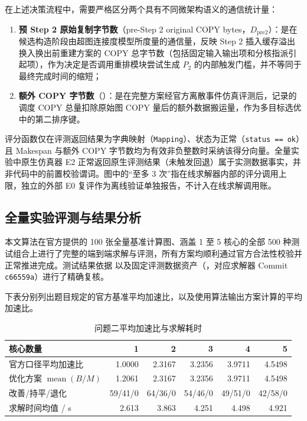 \documentclass[anonymous,withtoc]{gmcm2026}
\providecommand{\tightlist}{\setlength{\itemsep}{0pt}\setlength{\parskip}{0pt}}
\begin{document}
在上述决策流程中，需要严格区分两个具有不同微架构语义的通信统计量：

\begin{enumerate}
\def\labelenumi{\arabic{enumi}.}
\tightlist
\item
  \textbf{预 Step 2 原始复制字节数}（pre-Step 2 original COPY bytes，\(D_{\mathrm{pre2}}\)）：是在候选构造阶段由超图连接度模型所度量的通信量，反映 Step 2 插入缓存溢出换入换出前重建方案的 COPY 总字节数（包括固定输入输出项和分核指派引起项），作为决定是否调用重排模块尝试生成 \(P_2\) 的内部触发门槛，并不等同于最终完成时间的缩短；
\item
  \textbf{额外 COPY 字节数}（\texttt{}）：是在完整方案经官方离散事件仿真评测后，记录的调度 COPY 总量扣除原始图 COPY 量后的额外数据搬运量，作为多目标选优中的第二排序键。
\end{enumerate}

评分函数仅在评测返回结果为字典映射（\texttt{Mapping}）、状态为正常（\texttt{status\ ==\ \textquotesingle{}ok\textquotesingle{}}）且 Makespan 与额外 COPY 字节数均为有效非负整数时采纳该得分向量。全量实验中原生仿真器 E2 正常返回原生评测结果（未触发回退）属于实测数据事实，并非代码中的前置校验谓词。图中的``至多 3 次''指在线求解器内部的评分调用上限，独立的外部 E0 复评作为离线验证单独报告，不计入在线求解调用账。

\subsection{全量实验评测与结果分析}

本文算法在官方提供的 100 张全量基准计算图、涵盖 1 至 5 核心的全部 500 种测试组合上进行了完整的端到端求解与评测，所有方案均顺利通过官方合法性校验并正常推进完成。测试结果依据 \texttt{} 以及固定评测数据资产（\texttt{}，对应求解器 Commit \texttt{c66559a}）进行了精确复核。

下表分别列出题目规定的官方基准平均加速比，以及使用算法输出方案计算的平均加速比。



\begin{table}[H]\centering
\caption{问题二平均加速比与求解耗时}\label{tab:05-p2-1}\normalsize

\begin{tabularx}{\linewidth}{@{}Xrrrrr@{}}\toprule
核心数量 & 1 & 2 & 3 & 4 & 5 \\
\midrule
官方口径平均加速比 & 1.0000 & 2.3167 & 3.2356 & 3.9711 & 4.5498 \\
优化方案 $\operatorname{mean}(B/M)$ & 1.2061 & 2.3167 & 3.2356 & 3.9711 & 4.5498 \\
改善/持平/退化 & 59/41/0 & 64/36/0 & 54/46/0 & 49/51/0 & 42/58/0 \\
求解时间均值 / s & 2.613 & 3.863 & 4.251 & 4.498 & 4.921 \\
\bottomrule\end{tabularx}\end{table}
\end{document}
